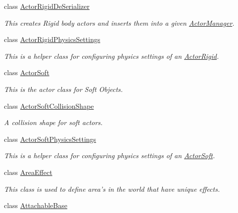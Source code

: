 \begin{DoxyCompactItemize}
class \hyperlink{classMezzanine_1_1ActorRigidDeSerializer}{ActorRigidDeSerializer}
\begin{DoxyCompactList}\small\item\em This creates Rigid body actors and inserts them into a given \hyperlink{classMezzanine_1_1ActorManager}{ActorManager}. \item\end{DoxyCompactList}\item 
class \hyperlink{classMezzanine_1_1ActorRigidPhysicsSettings}{ActorRigidPhysicsSettings}
\begin{DoxyCompactList}\small\item\em This is a helper class for configuring physics settings of an \hyperlink{classMezzanine_1_1ActorRigid}{ActorRigid}. \item\end{DoxyCompactList}\item 
class \hyperlink{classMezzanine_1_1ActorSoft}{ActorSoft}
\begin{DoxyCompactList}\small\item\em This is the actor class for Soft Objects. \item\end{DoxyCompactList}\item 
class \hyperlink{classMezzanine_1_1ActorSoftCollisionShape}{ActorSoftCollisionShape}
\begin{DoxyCompactList}\small\item\em A collision shape for soft actors. \item\end{DoxyCompactList}\item 
class \hyperlink{classMezzanine_1_1ActorSoftPhysicsSettings}{ActorSoftPhysicsSettings}
\begin{DoxyCompactList}\small\item\em This is a helper class for configuring physics settings of an \hyperlink{classMezzanine_1_1ActorSoft}{ActorSoft}. \item\end{DoxyCompactList}\item 
class \hyperlink{classMezzanine_1_1AreaEffect}{AreaEffect}
\begin{DoxyCompactList}\small\item\em This class is used to define area's in the world that have unique effects. \item\end{DoxyCompactList}\item 
class \hyperlink{classMezzanine_1_1AttachableBase}{AttachableBase}

\end{DoxyCompactItemize}
